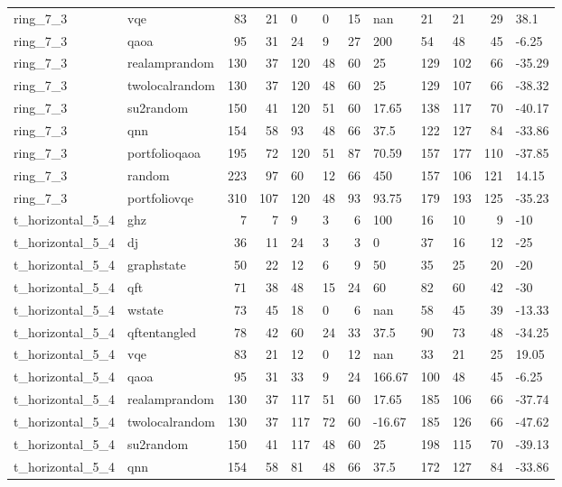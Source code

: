 \begin{longtable}{llrrllrlllrl}
ring\_7\_3 & vqe & 83 & 21 & 0 & 0 & 15 & nan & 21 & 21 & 29 & 38.1 \\
ring\_7\_3 & qaoa & 95 & 31 & 24 & 9 & 27 & 200 & 54 & 48 & 45 & -6.25 \\
ring\_7\_3 & realamprandom & 130 & 37 & 120 & 48 & 60 & 25 & 129 & 102 & 66 & -35.29 \\
ring\_7\_3 & twolocalrandom & 130 & 37 & 120 & 48 & 60 & 25 & 129 & 107 & 66 & -38.32 \\
ring\_7\_3 & su2random & 150 & 41 & 120 & 51 & 60 & 17.65 & 138 & 117 & 70 & -40.17 \\
ring\_7\_3 & qnn & 154 & 58 & 93 & 48 & 66 & 37.5 & 122 & 127 & 84 & -33.86 \\
ring\_7\_3 & portfolioqaoa & 195 & 72 & 120 & 51 & 87 & 70.59 & 157 & 177 & 110 & -37.85 \\
ring\_7\_3 & random & 223 & 97 & 60 & 12 & 66 & 450 & 157 & 106 & 121 & 14.15 \\
ring\_7\_3 & portfoliovqe & 310 & 107 & 120 & 48 & 93 & 93.75 & 179 & 193 & 125 & -35.23 \\
t\_horizontal\_5\_4 & ghz & 7 & 7 & 9 & 3 & 6 & 100 & 16 & 10 & 9 & -10 \\
t\_horizontal\_5\_4 & dj & 36 & 11 & 24 & 3 & 3 & 0 & 37 & 16 & 12 & -25 \\
t\_horizontal\_5\_4 & graphstate & 50 & 22 & 12 & 6 & 9 & 50 & 35 & 25 & 20 & -20 \\
t\_horizontal\_5\_4 & qft & 71 & 38 & 48 & 15 & 24 & 60 & 82 & 60 & 42 & -30 \\
t\_horizontal\_5\_4 & wstate & 73 & 45 & 18 & 0 & 6 & nan & 58 & 45 & 39 & -13.33 \\
t\_horizontal\_5\_4 & qftentangled & 78 & 42 & 60 & 24 & 33 & 37.5 & 90 & 73 & 48 & -34.25 \\
t\_horizontal\_5\_4 & vqe & 83 & 21 & 12 & 0 & 12 & nan & 33 & 21 & 25 & 19.05 \\
t\_horizontal\_5\_4 & qaoa & 95 & 31 & 33 & 9 & 24 & 166.67 & 100 & 48 & 45 & -6.25 \\
t\_horizontal\_5\_4 & realamprandom & 130 & 37 & 117 & 51 & 60 & 17.65 & 185 & 106 & 66 & -37.74 \\
t\_horizontal\_5\_4 & twolocalrandom & 130 & 37 & 117 & 72 & 60 & -16.67 & 185 & 126 & 66 & -47.62 \\
t\_horizontal\_5\_4 & su2random & 150 & 41 & 117 & 48 & 60 & 25 & 198 & 115 & 70 & -39.13 \\
t\_horizontal\_5\_4 & qnn & 154 & 58 & 81 & 48 & 66 & 37.5 & 172 & 127 & 84 & -33.86 \\

\end{longtable}
